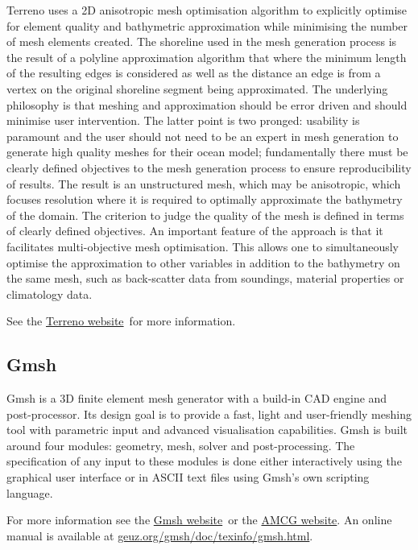 Terreno uses a 2D anisotropic mesh optimisation algorithm to explicitly optimise for 
element quality and bathymetric approximation while minimising the number of mesh
elements created. The shoreline used in the mesh generation process is the result 
of a polyline approximation algorithm that where the minimum length of the resulting 
edges is considered as well as the distance an edge is from a vertex on the original 
shoreline segment being approximated. The underlying philosophy is that meshing and 
approximation should be error driven and should minimise user intervention. The 
latter point is two pronged: usability is paramount and the user should not need 
to be an expert in mesh generation to generate high quality meshes for their ocean 
model; fundamentally there must be clearly defined objectives to the mesh generation 
process to ensure reproducibility of results. The result is an unstructured mesh, 
which may be anisotropic, which focuses resolution where it is required to optimally 
approximate the bathymetry of the domain. The criterion to judge the quality of the 
mesh is defined in terms of clearly defined objectives. An important feature of the 
approach is that it facilitates multi-objective mesh optimisation. This allows one to 
simultaneously optimise the approximation to other variables in addition to the 
bathymetry on the same mesh, such as back-scatter data from soundings, material 
properties or climatology data. 

See the \href{http://amcg.ese.ic.ac.uk/terreno}{Terreno website}\ for more information.

\subsection{Gmsh}
\label{sec:meshing_tools_non_fluidity_gmsh}

Gmsh is a 3D finite element mesh generator with a build-in CAD engine and post-processor.
Its design goal is to provide a fast, light and user-friendly meshing tool with parametric
input and advanced visualisation capabilities. Gmsh is built around four modules: geometry, 
mesh, solver and post-processing. The specification of any input to these modules is done
either interactively using the graphical user interface or in ASCII text files using Gmsh's
own scripting language. 

For more information see the \href{http://geuz.org/gmsh/}{Gmsh website}\ or the \href{http://amcg.ese.ic.ac.uk}{AMCG
website}. An online manual is available at \href{http://geuz.org/gmsh/doc/texinfo/gmsh.html}{geuz.org/gmsh/doc/texinfo/gmsh.html}.

